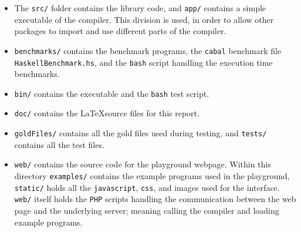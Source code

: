 \begin{itemize}
    \item The \texttt{src/} folder contains the \lan library code, and \texttt{app/} contains a
          simple executable of the compiler. This division is used, in order to allow other
          packages to import and use different parts of the \lan compiler.

    \item \texttt{benchmarks/} contains the benchmark
          programs, the \texttt{cabal} benchmark file \texttt{HaskellBenchmark.hs}, and the
          \texttt{bash} script handling the execution time benchmarks.
    
    \item \texttt{bin/} contains the \lan executable and the \texttt{bash} test script.

    \item \texttt{doc/} contains the \LaTeX source files for this report.

    \item \texttt{goldFiles/} contains all the gold files used during testing, and
          \texttt{tests/} contains all the \lan test files.

    \item \texttt{web/} contains the source code for the \lan playground webpage. Within this
          directory \texttt{examples/} contains the example programs used in the playground,
          \texttt{static/} holds all the \texttt{javascript}, \texttt{css}, and images
          used for the interface. \texttt{web/} itself holds the \texttt{PHP} scripts
          handling the communication between the web page and the underlying server;
          meaning calling the \lan compiler and loading example programs.
\end{itemize}

